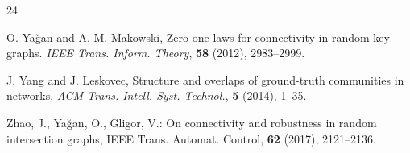 \documentclass[11pt, a4paper]{article}
\begin{document}
\begin{thebibliography}{24}


O. Yaǧan and A. M. Makowski,  Zero-one laws for connectivity in random key graphs. {\it IEEE Trans. Inform. Theory}, {\bf 58}  (2012), 2983--2999.



J. Yang and J. Leskovec,  Structure and overlaps of ground-truth 
communities in networks, {\it  ACM Trans. Intell. Syst. Technol.},
 {\bf 5} (2014), 1--35.
 
   
   Zhao, J., Yağan, O., Gligor, V.:
On connectivity and robustness in random intersection graphs,
IEEE Trans. Automat. Control, \textbf{62} (2017), 2121--2136.


\end{thebibliography}
\end{document}
